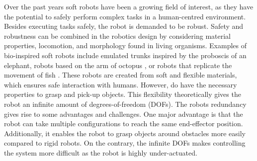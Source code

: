Over the past years soft robots have been a growing field of interest, as they have the potential to safely perform complex tasks in a human-centred environment. 
Besides executing tasks safely, the robot is demanded to be robust. Safety and robustness can be combined in the robotics design by considering material properties, locomotion, and morphology found in living organisms. Examples of bio-inspired soft robots include emulated trunks \cite{hannan2003kinematics} inspired by the proboscis of an elephant, robots based on the arm of octopus \cite{wang2013visual}, or robots that replicate the movement of fish \cite{marchese2014autonomous}. These robots are created from soft and flexible materials, which ensures safe interaction with humans. However, do have the necessary properties to grasp and pick-up objects. This flexibility theoretically gives the robot an infinite amount of degrees-of-freedom (DOFs). The robots redundancy gives rise to some advantages and challenges. One major advantage is that the robot can take multiple configurations to reach the same end-effector position. Additionally, it enables the robot to grasp objects around obstacles more easily compared to rigid robots. On the contrary, the infinite DOFs makes controlling the system more difficult as the robot is highly under-actuated.


